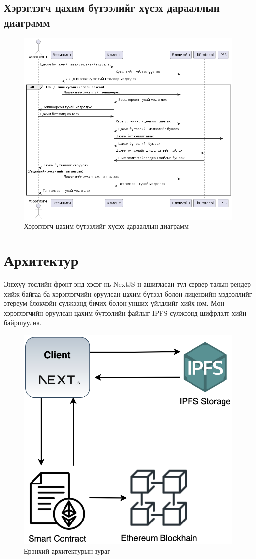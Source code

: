 \subsection{Хэрэглэгч цахим бүтээлийг хүсэх дарааллын диаграмм}
\begin{figure}[h!]
	\centering
	\includegraphics[scale=0.6, angle=90]{src/images/sequence-2.png}
	\caption{Хэрэглэгч цахим бүтээлийг хүсэх дарааллын диаграмм}
\end{figure}

\newpage
\section{Архитектур}
Энэхүү төслийн фронт-энд хэсэг нь NextJS-н ашигласан тул сервер талын рендер хийж байгаа ба хэрэглэгчийн оруулсан цахим бүтээл болон лицензийн мэдээллийг этереум блокчэйн сүлжээнд бичих болон унших үйлдлийг хийх юм. Мөн хэрэглэгчийн оруулсан цахим бүтээлийн файлыг IPFS сүлжээнд шифрлэлт хийн байршуулна.

\begin{figure}[h!]
	\centering
	\includegraphics[scale=0.4]{src/images/architecture.png}
	\caption{Ерөнхий архитектурын зураг}
\end{figure}

